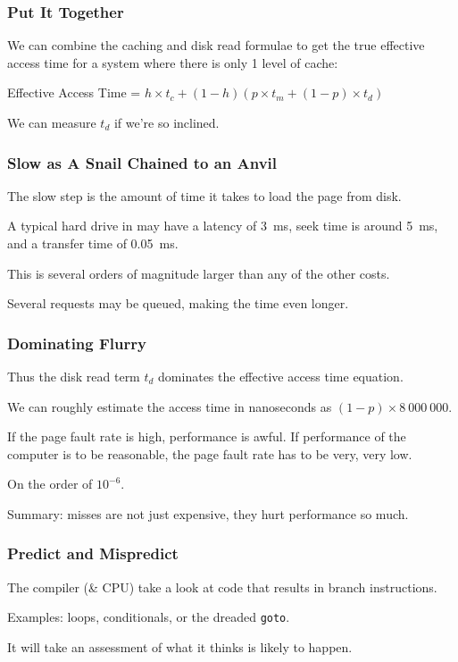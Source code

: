 \begin{frame}
\frametitle{Put It Together}

We can combine the caching and disk read formulae to get the true effective access time for a system where there is only 1 level of cache:

\begin{center}
	Effective Access Time = $ h \times t_{c} + (1 - h) ( p \times t_{m} + (1 - p) \times t_{d})$
\end{center}

We can measure $t_{d}$ if we're so inclined.

\end{frame}



\begin{frame}
\frametitle{Slow as A Snail Chained to an Anvil}

The slow step is the amount of time it takes to load the page from disk. 

A typical hard drive in may have a latency of 3~ms, seek time is around 5~ms, and a transfer time of 0.05~ms. 

This is  several orders of magnitude larger than any of the other costs.

Several requests may be queued, making the time even longer.

\end{frame}



\begin{frame}
\frametitle{Dominating Flurry}


Thus the disk read term $t_{d}$ dominates the effective access time equation. 

We can roughly estimate the access time in nanoseconds as $(1-p) \times 8~000~000$. 

If the page fault rate is high, performance is awful. If performance of the computer is to be reasonable, the page fault rate has to be very, very low. 

On the order of $10^{-6}$. 

Summary: misses are not just expensive, they hurt performance so much.

\end{frame}



\begin{frame}
\frametitle{Predict and Mispredict}
The compiler (\& CPU) take a look at code that results in branch instructions.

Examples: loops, conditionals, or the dreaded \texttt{goto}.

It will take an assessment of what it thinks is likely to happen. 

\end{frame}



